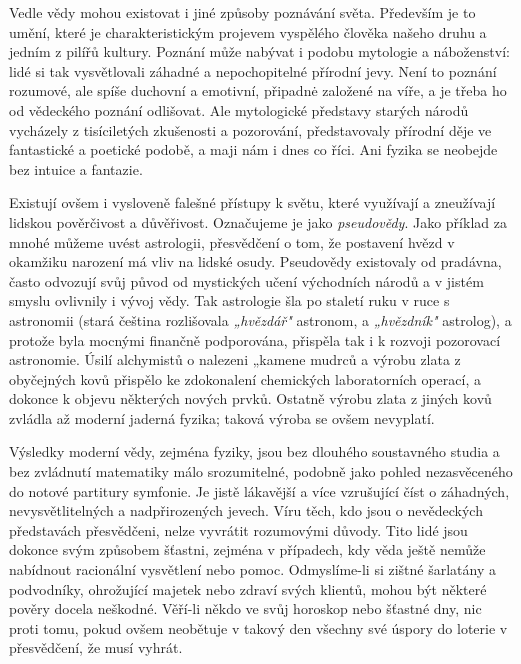       Vedle vědy mohou existovat i jiné způsoby poznávání světa. Především je to umění, které je
      charakteristickým projevem vyspělého člověka našeho druhu a jedním z pilířů kultury. Poznání
      může nabývat i podobu mytologie a náboženství: lidé si tak vysvětlovali záhadné a
      nepochopitelné přírodní jevy. Není to poznání rozumové, ale spíše duchovní a emotivní,
      připadnė založené na víře, a je třeba ho od vědeckého poznání odlišovat. Ale mytologické
      představy starých národů vycházely z tisíciletých zkušenosti a pozorování, představovaly
      přírodní děje ve fantastické a poetické podobě, a maji nám i dnes co říci. Ani fyzika se
      neobejde bez intuice a fantazie.


      Existují ovšem i vysloveně falešné přístupy k světu, které využívají a zneužívají lidskou
      pověrčivost a důvěřivost. Označujeme je jako \emph{pseudovědy}. Jako příklad za mnohé můžeme
      uvést astrologii, přesvědčení o tom, že postavení hvězd v okamžiku narození má vliv na lidské
      osudy. Pseudovědy existovaly od pradávna, často odvozují svůj původ od mystických učení
      východních národů a v jistém smyslu ovlivnily i vývoj vědy. Tak astrologie šla po staletí ruku
      v ruce s astronomii (stará čeština rozlišovala \emph{„hvězdář"} astronom, a \emph{„hvězdník"}
      astrolog), a protože byla mocnými finančně podporována, přispěla tak i k rozvoji pozorovací
      astronomie. Úsilí alchymistů o nalezeni „kamene mudrců a výrobu zlata z obyčejných kovů
      přispělo ke zdokonalení chemických laboratorních operací, a dokonce k objevu některých nových
      prvků. Ostatně výrobu zlata z jiných kovů zvládla až moderní jaderná fyzika; taková výroba se
      ovšem nevyplatí.

      Výsledky moderní vědy, zejména fyziky, jsou bez dlouhého soustavného studia a bez zvládnutí
      matematiky málo srozumitelné, podobně jako pohled nezasvěceného do notové partitury symfonie.
      Je jistě lákavější a více vzrušující číst o záhadných, nevysvětlitelných a nadpřirozených
      jevech. Víru těch, kdo jsou o nevědeckých představách přesvědčeni, nelze vyvrátit rozumovými
      důvody. Tito lidé jsou dokonce svým způsobem šťastni, zejména v případech, kdy věda ještě
      nemůže nabídnout racionální vysvětlení nebo pomoc. Odmyslíme-li si zištné šarlatány a
      podvodníky, ohrožující majetek nebo zdraví svých klientů, mohou být některé pověry docela
      neškodné. Věří-li někdo ve svůj horoskop nebo šťastné dny, nic proti tomu, pokud ovšem
      neobětuje v takový den všechny své úspory do loterie v přesvědčení, že musí vyhrát.

